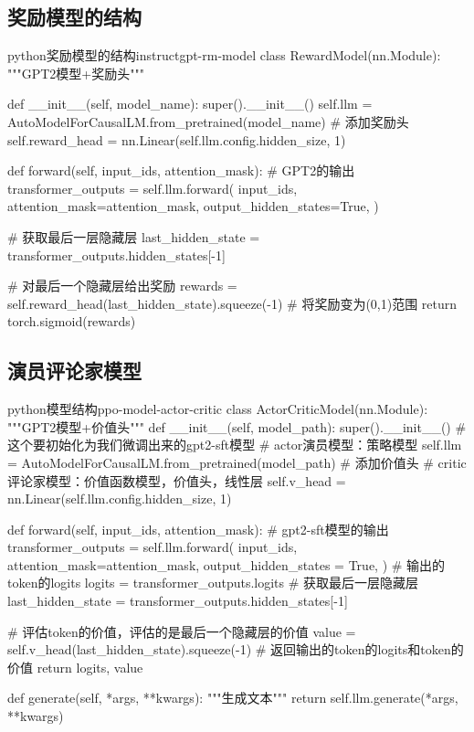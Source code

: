 \documentclass[lang=cn,newtx,10pt,scheme=chinese]{elegantbook}
\begin{document}
\subsection{奖励模型的结构}

\begin{codebox}{python}{奖励模型的结构}{instructgpt-rm-model}
class RewardModel(nn.Module):
    """GPT2模型+奖励头"""

    def __init__(self, model_name):
        super().__init__()
        self.llm = AutoModelForCausalLM.from_pretrained(model_name)
        # 添加奖励头
        self.reward_head = nn.Linear(self.llm.config.hidden_size, 1)

    def forward(self, input_ids, attention_mask):
        # GPT2的输出
        transformer_outputs = self.llm.forward(
            input_ids,
            attention_mask=attention_mask,
            output_hidden_states=True,
        )

        # 获取最后一层隐藏层
        last_hidden_state = transformer_outputs.hidden_states[-1]

        # 对最后一个隐藏层给出奖励
        rewards = self.reward_head(last_hidden_state).squeeze(-1)
        # 将奖励变为(0,1)范围
        return torch.sigmoid(rewards)
\end{codebox}

\subsection{演员评论家模型}

\begin{codebox}{python}{模型结构}{ppo-model-actor-critic}
class ActorCriticModel(nn.Module):
    """GPT2模型+价值头"""
    def __init__(self, model_path):
        super().__init__()
        # 这个要初始化为我们微调出来的gpt2-sft模型
        # actor演员模型：策略模型
        self.llm = AutoModelForCausalLM.from_pretrained(model_path)
        # 添加价值头
        # critic评论家模型：价值函数模型，价值头，线性层
        self.v_head = nn.Linear(self.llm.config.hidden_size, 1)

    def forward(self, input_ids, attention_mask):
        # gpt2-sft模型的输出
        transformer_outputs = self.llm.forward(
            input_ids,
            attention_mask=attention_mask,
            output_hidden_states = True,
        )
        # 输出的token的logits
        logits = transformer_outputs.logits
        # 获取最后一层隐藏层
        last_hidden_state = transformer_outputs.hidden_states[-1]

        # 评估token的价值，评估的是最后一个隐藏层的价值
        value = self.v_head(last_hidden_state).squeeze(-1)
        # 返回输出的token的logits和token的价值
        return logits, value

    def generate(self, *args, **kwargs):
        """生成文本"""
        return self.llm.generate(*args, **kwargs)
\end{codebox}
\end{document}
